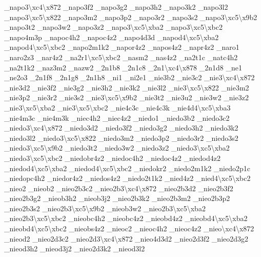 \begin{DoxyCompactItemize}
\-\_\-napo3\textbackslash{}xc4\textbackslash{}x872 \-\_\-napo3f2 \-\_\-napo3g2 \-\_\-napo3h2 \-\_\-napo3k2 \-\_\-napo3l2 \-\_\-napo3\textbackslash{}xc5\textbackslash{}x822 \-\_\-napo3m2 \-\_\-napo3p2 \-\_\-napo3r2 \-\_\-napo3s2 \-\_\-napo3\textbackslash{}xc5\textbackslash{}x9b2 \-\_\-napo3t2 \-\_\-napo3w2 \-\_\-napo3z2 \-\_\-napo3\textbackslash{}xc5\textbackslash{}xba2 \-\_\-napo3\textbackslash{}xc5\textbackslash{}xbc2 \-\_\-napo4m3p \-\_\-napoc4h2 \-\_\-napoc4z2 \-\_\-napo4d3d \-\_\-napod4\textbackslash{}xc5\textbackslash{}xba2 \-\_\-napod4\textbackslash{}xc5\textbackslash{}xbc2 \-\_\-napo2m1k2 \-\_\-napor4z2 \-\_\-napos4z2 \-\_\-napr4z2 \-\_\-naro1 \-\_\-naro2z3 \-\_\-nar4z2 \-\_\-na2r1\textbackslash{}xc5\textbackslash{}xbc2 \-\_\-nasm2 \-\_\-nas4z2 \-\_\-na2t1c \-\_\-natc4h2 \-\_\-na2t1k2 \-\_\-naz3m2 \-\_\-nazw2 \-\_\-2n1b8 \-\_\-2n1c8 \-\_\-2n1\textbackslash{}xc4\textbackslash{}x878 \-\_\-2n1d8 \-\_\-ne1 \-\_\-ne2o3 \-\_\-2n1f8 \-\_\-2n1g8 \-\_\-2n1h8 \-\_\-ni1 \-\_\-ni2e1 \-\_\-nie3b2 \-\_\-nie3c2 \-\_\-nie3\textbackslash{}xc4\textbackslash{}x872 \-\_\-nie3d2 \-\_\-nie3f2 \-\_\-nie3g2 \-\_\-nie3h2 \-\_\-nie3k2 \-\_\-nie3l2 \-\_\-nie3\textbackslash{}xc5\textbackslash{}x822 \-\_\-nie3m2 \-\_\-nie3p2 \-\_\-nie3r2 \-\_\-nie3s2 \-\_\-nie3\textbackslash{}xc5\textbackslash{}x9b2 \-\_\-nie3t2 \-\_\-nie3u2 \-\_\-nie3w2 \-\_\-nie3z2 \-\_\-nie3\textbackslash{}xc5\textbackslash{}xba2 \-\_\-nie3\textbackslash{}xc5\textbackslash{}xbc2 \-\_\-nie4c3c \-\_\-nie4c3k \-\_\-nie4d4\textbackslash{}xc5\textbackslash{}xba3 \-\_\-nie4m3c \-\_\-nie4m3k \-\_\-niec4h2 \-\_\-niec4z2 \-\_\-niedo1 \-\_\-niedo3b2 \-\_\-niedo3c2 \-\_\-niedo3\textbackslash{}xc4\textbackslash{}x872 \-\_\-niedo3d2 \-\_\-niedo3f2 \-\_\-niedo3g2 \-\_\-niedo3h2 \-\_\-niedo3k2 \-\_\-niedo3l2 \-\_\-niedo3\textbackslash{}xc5\textbackslash{}x822 \-\_\-niedo3m2 \-\_\-niedo3p2 \-\_\-niedo3r2 \-\_\-niedo3s2 \-\_\-niedo3\textbackslash{}xc5\textbackslash{}x9b2 \-\_\-niedo3t2 \-\_\-niedo3w2 \-\_\-niedo3z2 \-\_\-niedo3\textbackslash{}xc5\textbackslash{}xba2 \-\_\-niedo3\textbackslash{}xc5\textbackslash{}xbc2 \-\_\-niedobr4z2 \-\_\-niedoc4h2 \-\_\-niedoc4z2 \-\_\-niedod4z2 \-\_\-niedod4\textbackslash{}xc5\textbackslash{}xba2 \-\_\-niedod4\textbackslash{}xc5\textbackslash{}xbc2 \-\_\-niedokr2 \-\_\-niedo2m1k2 \-\_\-niedo2p1c \-\_\-niedopc4h2 \-\_\-niedor4z2 \-\_\-niedos4z2 \-\_\-niedo2t1k2 \-\_\-nied4z2 \-\_\-nied4\textbackslash{}xc5\textbackslash{}xbc2 \-\_\-nieo2 \-\_\-nieob2 \-\_\-nieo2b3c2 \-\_\-nieo2b3\textbackslash{}xc4\textbackslash{}x872 \-\_\-nieo2b3d2 \-\_\-nieo2b3f2 \-\_\-nieo2b3g2 \-\_\-nieob3h2 \-\_\-nieob3j2 \-\_\-nieo2b3k2 \-\_\-nieo2b3m2 \-\_\-nieo2b3p2 \-\_\-nieo2b3s2 \-\_\-nieo2b3\textbackslash{}xc5\textbackslash{}x9b2 \-\_\-nieob3w2 \-\_\-nieo2b3\textbackslash{}xc5\textbackslash{}xba2 \-\_\-nieo2b3\textbackslash{}xc5\textbackslash{}xbc2 \-\_\-nieobc4h2 \-\_\-nieobc4z2 \-\_\-nieobd4z2 \-\_\-nieobd4\textbackslash{}xc5\textbackslash{}xba2 \-\_\-nieobd4\textbackslash{}xc5\textbackslash{}xbc2 \-\_\-nieobs4z2 \-\_\-nieoc2 \-\_\-nieoc4h2 \-\_\-nieoc4z2 \-\_\-nieo\textbackslash{}xc4\textbackslash{}x872 \-\_\-nieod2 \-\_\-nieo2d3c2 \-\_\-nieo2d3\textbackslash{}xc4\textbackslash{}x872 \-\_\-nieo4d3d2 \-\_\-nieo2d3f2 \-\_\-nieo2d3g2 \-\_\-nieod3h2 \-\_\-nieod3j2 \-\_\-nieo2d3k2 \-\_\-nieod3l2 
\end{DoxyCompactItemize}
